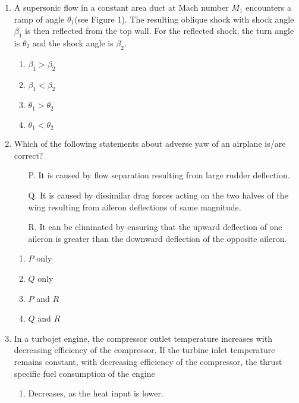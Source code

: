 \documentclass[journal,12pt,onecolumn]{IEEEtran}
\theoremstyle{remark}
\begin{document}
\begin{enumerate}
 \item A supersonic flow in a constant area duct at Mach number $M_1$ encounters a ramp of angle $\theta_1$(see Figure 1). The resulting oblique shock with shock angle $\beta_1$ is then reflected from the top wall. For the reflected shock, the turn angle is $\theta_2$ and the shock angle is $\beta_2$.
      \begin{figure}[H]
        \centering
          
    \end{figure}
    \begin{enumerate}
        \item $\beta_1 > \beta_2$
        \item $\beta_1 < \beta_2$
        \item $\theta_1 > \theta_2$
        \item $\theta_1 < \theta_2$
    \end{enumerate}
    \item Which of the following statements about adverse yaw of an airplane is/are correct?
    \begin{enumerate}
        \item [P.] It is caused by flow separation resulting from large rudder deflection.
        \item [Q.]It is caused by dissimilar drag forces acting on the two halves of the wing resulting from aileron deflections of same magnitude.
        \item [R.]It can be eliminated by ensuring that the upward deflection of one aileron is greater than the downward deflection of the opposite aileron.
        \end{enumerate}
        \begin{enumerate}
        \item $P$ only
        \item $Q$ only
        \item $P$ and $R$
        \item $Q$ and $R$
    \end{enumerate}
    \item In a turbojet engine, the compressor outlet temperature increases with decreasing efficiency of the compressor. If the turbine inlet temperature remains constant, with decreasing efficiency of the compressor, the thrust specific fuel consumption of the engine
    \begin{enumerate}
        \item Decreases, as the heat input is lower.

\end{enumerate}
\end{enumerate}
\end{document}

